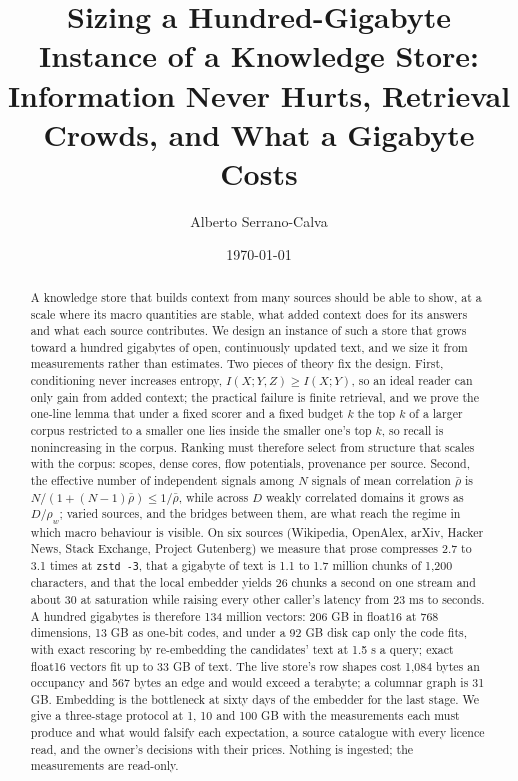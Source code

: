 \documentclass[11pt]{article}
\title{Sizing a Hundred-Gigabyte Instance of a Knowledge Store:\\
Information Never Hurts, Retrieval Crowds, and What a Gigabyte Costs}
\author{Alberto Serrano-Calva}
\date{\today}
\theoremstyle{plain}
\theoremstyle{definition}
\theoremstyle{remark}
\newcommand{\code}[1]{\texttt{#1}}
\begin{document}
\maketitle

\begin{abstract}
A knowledge store that builds context from many sources should be able to show, at a scale where
its macro quantities are stable, what added context does for its answers and what each source
contributes. We design an instance of such a store that grows toward a hundred gigabytes of open,
continuously updated text, and we size it from measurements rather than estimates. Two pieces of
theory fix the design. First, conditioning never increases entropy, $I(X;Y,Z)\ge I(X;Y)$, so an
ideal reader can only gain from added context; the practical failure is finite retrieval, and we
prove the one-line lemma that under a fixed scorer and a fixed budget $k$ the top $k$ of a larger
corpus restricted to a smaller one lies inside the smaller one's top $k$, so recall is nonincreasing
in the corpus. Ranking must therefore select from structure that scales with the corpus: scopes,
dense cores, flow potentials, provenance per source. Second, the effective number of independent
signals among $N$ signals of mean correlation $\bar\rho$ is $N/(1+(N-1)\bar\rho)\le 1/\bar\rho$,
while across $D$ weakly correlated domains it grows as $D/\rho_w$; varied sources, and the bridges
between them, are what reach the regime in which macro behaviour is visible. On six sources
(Wikipedia, OpenAlex, arXiv, Hacker News, Stack Exchange, Project Gutenberg) we measure that prose
compresses 2.7 to 3.1 times at \code{zstd -3}, that a gigabyte of text is 1.1 to 1.7 million chunks of
1,200 characters, and that the local embedder yields 26 chunks a second on one stream and about 30
at saturation while raising every other caller's latency from 23 ms to seconds. A hundred gigabytes
is therefore 134 million vectors: 206 GB in float16 at 768 dimensions, 13 GB as one-bit codes, and
under a 92 GB disk cap only the code fits, with exact rescoring by re-embedding the candidates'
text at 1.5 s a query; exact float16 vectors fit up to 33 GB of text. The live store's row shapes
cost 1,084 bytes an occupancy and 567 bytes an edge and would exceed a terabyte; a columnar graph
is 31 GB. Embedding is the bottleneck at sixty days of the embedder for the last stage. We give a
three-stage protocol at 1, 10 and 100 GB with the measurements each must produce and what would
falsify each expectation, a source catalogue with every licence read, and the owner's decisions
with their prices. Nothing is ingested; the measurements are read-only.
\end{abstract}
\end{document}
